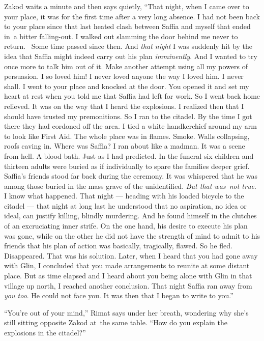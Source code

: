 \documentclass[twoside,11pt]{book}
\begin{document}
Zakod waits a minute and then says quietly, ``That night, when I came over to your
place,{ }it was for the first time after a very long absence. I had not been
back{ }to your place since that last heated clash between Saffia and myself
that ended in~a bitter falling-out. I walked out slamming the door behind me never to return. ~Some time passed since
then. And \textit{that night} I was suddenly hit by the idea that Saffia might indeed carry out his plan
\textit{imminently}. And I wanted to try once more to talk him out of it. Make another attempt using all my powers of
persuasion. I so loved him! I never loved anyone the way I loved him. I never shall. I went to your place and knocked
at the door. You opened it and set my heart at rest when you told me that Saffia had left for work. So I went back
home relieved.  It was on the way that I heard the explosions. I realized then that I should have trusted my
premonitions. So I ran to the citadel. By the time I got there they had cordoned off the area. I tied a white
handkerchief around my arm to look like First Aid. The whole place was in flames. Smoke. Walls collapsing, roofs caving
in. Where was Saffia? I ran about like a madman. It was a scene from hell. A blood bath. Just as I had predicted. In
the funeral six children and thirteen adults were buried as if individually to spare the families deeper grief.
Saffia's friends stood far back during the ceremony. It was whispered that he was among those buried in the mass grave
of the unidentified. \textit{But that was~not true}. I know what happened. That night --- heading with his loaded
bicycle to the citadel --- that night at long last he understood that no aspiration, no idea or ideal, can justify
killing, blindly murdering. And he found himself in the clutches of an excruciating inner strife. On the one hand, his
desire to execute his plan was gone, while on the other he did not have the strength of mind to admit to his friends
that his plan of action was basically, tragically, flawed. So he fled. Disappeared. That was his solution. Later, when
I heard that you had gone away with Glin, I concluded that you made arrangements to reunite at some distant place. But
as time elapsed and I heard about you being alone with Glin in that village up north, I reached another conclusion.
That night Saffia ran away from\textit{ you too}. He could not face you. It was then that I began to write to
you.''

``You're out of your mind,'' Rimat says under her breath, wondering why she's still sitting
opposite Zakod at~the same table. ``How do you explain the explosions in the citadel?''
\end{document}
